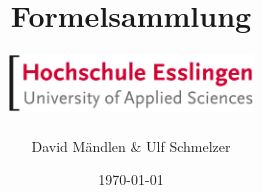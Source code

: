 
\subject{Physik II}
\title{Formelsammlung\\}
\author{\includegraphics[width=6.5cm]{images/logo}\\ \\  David Mändlen \& Ulf Schmelzer}
\date{\today}
\maketitle



